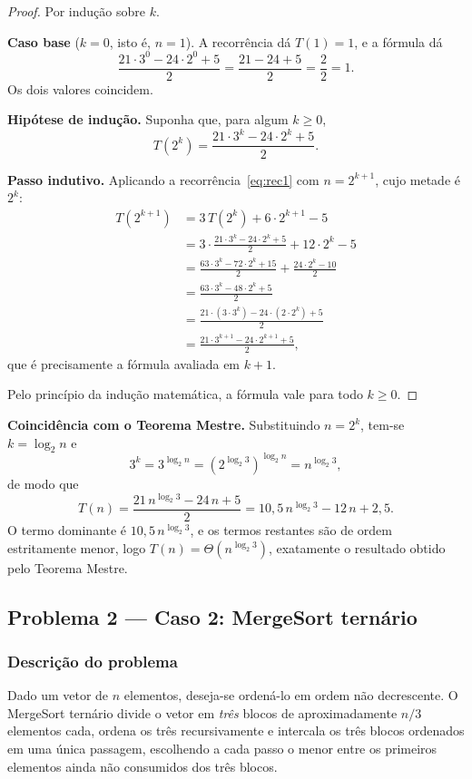 \documentclass[11pt,a4paper]{article}
\begin{document}
\begin{proof}
Por indução sobre $k$.

\textbf{Caso base} ($k=0$, isto é, $n=1$). A recorrência dá $T(1)=1$, e a fórmula dá
\[
\frac{21\cdot3^0-24\cdot2^0+5}{2}=\frac{21-24+5}{2}=\frac{2}{2}=1.
\]
Os dois valores coincidem.

\textbf{Hipótese de indução.} Suponha que, para algum $k\ge0$,
\[
T(2^k)=\frac{21\cdot3^k-24\cdot2^k+5}{2}.
\]

\textbf{Passo indutivo.} Aplicando a recorrência~\eqref{eq:rec1} com $n=2^{k+1}$, cujo metade é $2^k$:
\begin{align*}
T(2^{k+1})&=3\,T(2^k)+6\cdot2^{k+1}-5\\
&=3\cdot\frac{21\cdot3^k-24\cdot2^k+5}{2}+12\cdot2^{k}-5\\
&=\frac{63\cdot3^k-72\cdot2^k+15}{2}+\frac{24\cdot2^{k}-10}{2}\\
&=\frac{63\cdot3^k-48\cdot2^k+5}{2}\\
&=\frac{21\cdot(3\cdot3^k)-24\cdot(2\cdot2^k)+5}{2}\\
&=\frac{21\cdot3^{k+1}-24\cdot2^{k+1}+5}{2},
\end{align*}
que é precisamente a fórmula avaliada em $k+1$.

Pelo princípio da indução matemática, a fórmula vale para todo $k\ge0$.
\end{proof}

\textbf{Coincidência com o Teorema Mestre.} Substituindo $n=2^k$, tem-se $k=\log_2 n$ e
\[
3^k=3^{\log_2 n}=\left(2^{\log_2 3}\right)^{\log_2 n}=n^{\log_2 3},
\]
de modo que
\begin{equation}
T(n)=\frac{21\,n^{\log_2 3}-24\,n+5}{2}=10{,}5\,n^{\log_2 3}-12\,n+2{,}5.
\label{eq:fechada1}
\end{equation}
O termo dominante é $10{,}5\,n^{\log_2 3}$, e os termos restantes são de ordem estritamente menor, logo $T(n)=\Theta\!\left(n^{\log_2 3}\right)$, exatamente o resultado obtido pelo Teorema Mestre.

\subsection{Problema 2 --- Caso 2: MergeSort ternário}

\subsubsection{Descrição do problema}

Dado um vetor de $n$ elementos, deseja-se ordená-lo em ordem não decrescente. O MergeSort ternário divide o vetor em \emph{três} blocos de aproximadamente $n/3$ elementos cada, ordena os três recursivamente e intercala os três blocos ordenados em uma única passagem, escolhendo a cada passo o menor entre os primeiros elementos ainda não consumidos dos três blocos.
\end{document}
